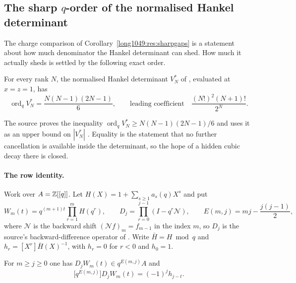 \documentclass[11pt]{article}
\begin{document}
\subsection{The sharp $q$-order of the normalised Hankel
determinant}\label{long1049:sec:hankel-order}

The charge comparison of Corollary~\ref{long1049:res:sharpgaps} is a statement about how
much denominator the Hankel determinant can shed.  How much it actually sheds
is settled by the following exact order.

\begin{theorem}\label{long1049:res:zudilin-sharp-qorder}
For every rank $N$, the normalised Hankel determinant $V_N^{*}$ of
\cite[Sec.~4]{zudilin2016}, evaluated at $x=z=1$, has
\[
 \operatorname{ord}_q V_N^{*}=\frac{N(N-1)(2N-1)}{6},
 \qquad
 \text{leading coefficient}\quad\frac{(N!)^{2}(N+1)!}{2^{N}} .
\]
\end{theorem}

\noindent The source proves the inequality
$\operatorname{ord}_q V_N^{*}\ge N(N-1)(2N-1)/6$ and uses it as an upper bound
on $|V_N^{*}|$ \cite[Sec.~4]{zudilin2016}.  Equality is the statement that no
further cancellation is available inside the determinant, so the hope of a
hidden cubic decay there is closed.

\paragraph{The row identity.}
Work over $A=\mathbb{Z}[[q]]$.  Let $H(X)=1+\sum_{s\ge1}a_s(q)X^{s}$ and put
\[
 W_m(t)=q^{(m+1)t}\prod_{r=1}^{m}H(q^{r}),
 \qquad
 D_j=\prod_{r=0}^{j-1}(I-q^{r}\mathcal N),
 \qquad
 E(m,j)=mj-\frac{j(j-1)}2,
\]
where $\mathcal N$ is the backward shift $(\mathcal Nf)_m=f_{m-1}$ in the index
$m$, so $D_j$ is the source's backward-difference operator of
\cite[Sec.~4]{zudilin2016}.  Write $\bar H=H\bmod q$ and
$h_r=[X^{r}]\bar H(X)^{-1}$, with $h_r=0$ for $r<0$ and $h_0=1$.

\begin{lemma}\label{long1049:res:allrowinitial}
For $m\ge j\ge0$ one has $D_jW_m(t)\in q^{E(m,j)}A$ and
\[
 \bigl[q^{E(m,j)}\bigr]D_jW_m(t)=(-1)^{j}h_{j-t}.
\]
\end{lemma}
\end{document}
